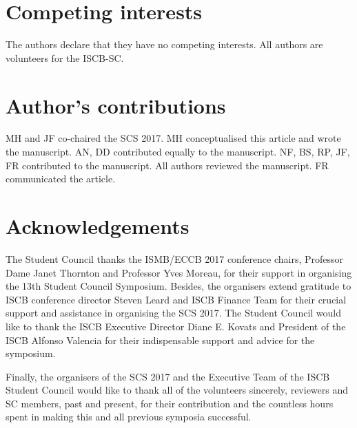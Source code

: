 \documentclass[]{article}%
\begin{document}
	\section*{Competing interests}
	The authors declare that they have no competing interests. All authors are volunteers for the ISCB-SC.
	
	\section*{Author's contributions}
	MH and JF co-chaired the SCS 2017. MH conceptualised this article and wrote the manuscript. AN, DD contributed equally to the manuscript. NF, BS, RP, JF, FR contributed to the manuscript. All authors reviewed the manuscript. FR communicated the article.
	
	\section*{Acknowledgements}
	The Student Council thanks the ISMB/ECCB 2017 conference chairs, Professor Dame Janet Thornton and Professor Yves Moreau, for their support in organising the 13th Student Council Symposium. Besides, the organisers extend gratitude to ISCB conference director Steven Leard and ISCB Finance Team for their crucial support and assistance in organising the SCS 2017.  The Student Council would like to thank the ISCB Executive Director Diane E. Kovats and President of the ISCB Alfonso Valencia for their indispensable support and advice for the symposium. 
	
	Finally, the organisers of the SCS 2017 and the Executive Team of the ISCB Student Council would like to thank all of the volunteers sincerely, reviewers and  SC members, past and present, for their contribution and the countless hours spent in making this and all previous symposia successful.\\	
	

	
\end{document}
